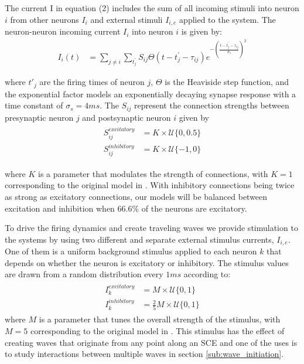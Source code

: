 \documentclass[12pt]{article}
\begin{document}
The current I in equation (2) includes the sum of all incoming stimuli into neuron $i$ from other neurons $I_i$ and external stimuli $I_{i,e}$ applied to the system. 
The neuron-neuron incoming current $I_i$ into neuron $i$ is given by:
\begin{align}
 I_i(t) &= \sum_{j\ne i} \sum_{t^\prime_j} S_{ij}  \Theta(t-t^\prime_j-\tau_{ij})e^{-(\frac{t-t^\prime_j-\tau_{ij}}{\sigma_s})^2}
\end{align}

where $t'_j$ are the firing times of neuron $j$, $\Theta$ is the Heaviside step function, and the exponential factor models an exponentially decaying synapse response with a time constant of $\sigma_s = 4 ms$. 
The $S_{ij}$ represent the connection strengths between presynaptic neuron $j$ and postsynaptic neuron $i$ given by
\begin{align}
 \begin{split}
  S_{ij}^{excitatory} &= K \times \mathcal{U}\{0,0.5 \} \\
  S_{ij}^{inhibitory} &= K \times \mathcal{U}\{-1,0 \} 
 \end{split}
\end{align}

where $K$ is a parameter that modulates the strength of connections, with $K=1$ corresponding to the original model in \parencite{izhikevich2003}.
With inhibitory connections being twice as strong as excitatory connections, our models will be balanced between excitation and inhibition when $66.6\%$ of the neurons are excitatory. 

To drive the firing dynamics and create traveling waves we provide stimulation to the systems by using two different and separate external stimulus currents, $I_{i,e}$. 
One of them is a uniform background stimulus applied to each neuron $k$ that depends on whether the neuron is excitatory or inhibitory.
The stimulus values are drawn from a random distribution every $1 ms$ according to:
\begin{align}\label{eq:randomstim}
 \begin{split}
  I_k^{excitatory} &= M \times \mathcal{U}\{0,1 \} \\
  I_k^{inhibitory} &= \frac{2}{5} M \times \mathcal{U}\{0,1 \}
 \end{split}
\end{align}
where $M$ is a parameter that tunes the overall strength of the stimulus, with $M=5$ corresponding to the original model in \parencite{izhikevich2003}. 
This stimulus has the effect of creating waves that originate from any point along an SCE and one of the uses is to study interactions between multiple waves in section \ref{sub:wave_initiation}.
\end{document}
